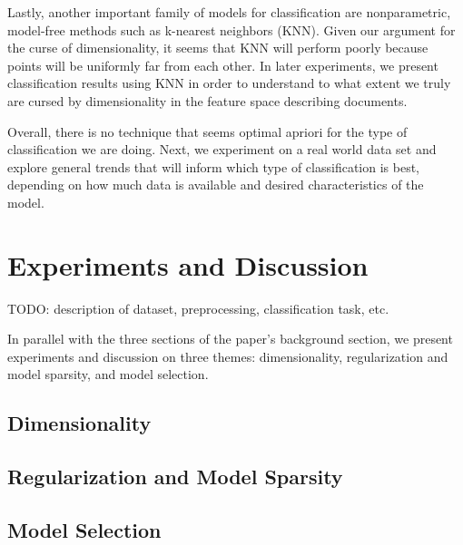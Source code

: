 \documentclass[]{article}
\begin{document}
	Lastly, another important family of models for classification are nonparametric, model-free methods such as k-nearest neighbors (KNN). Given our argument for the curse of dimensionality, it seems that KNN will perform poorly because points will be uniformly far from each other. In later experiments, we present classification results using KNN in order to understand to what extent we truly are cursed by dimensionality in the feature space describing documents. 

Overall, there is no technique that seems optimal apriori for the type of classification we are doing. Next, we experiment on a real world data set and explore general trends that will inform which type of classification is best, depending on how much data is available and desired characteristics of the model. 

\section{Experiments and Discussion}

TODO: description of dataset, preprocessing, classification task, etc.

In parallel with the three sections of the paper's background section, we  present experiments and discussion on three themes: dimensionality, regularization and model sparsity, and model selection. 

\subsection{Dimensionality}


\subsection{Regularization and Model Sparsity}


\subsection{Model Selection}


\pagebreak


\end{document}
